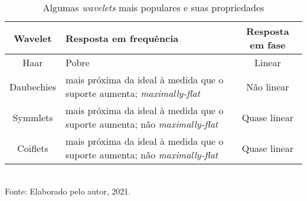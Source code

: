 \begin{table}[h]
	\centering
	\caption{Algumas \textit{wavelets} mais populares e suas propriedades}
	\begin{tabular}{|c|p{75mm}|c|}
			\hline 
			\textbf{Wavelet} & \textbf{Resposta em frequência} & \textbf{Resposta em fase} \\ 
			\hline 
			Haar & Pobre &  Linear \\ 
			\hline 
			Daubechies & mais próxima da ideal à medida que o \newline  suporte aumenta; \textit{maximally-flat}  &  Não linear \\ 
			\hline 
			Symmlets & mais próxima da ideal à medida que o \newline  suporte aumenta; não \textit{maximally-flat}  & Quase linear \\ 
			\hline 
			Coiflets & mais próxima da ideal à medida que o \newline  suporte aumenta; não \textit{maximally-flat}  & Quase linear \\ 
			\hline 
	\end{tabular} 
	\label{tab:waveletsProperties}
	\\Fonte: Elaborado pelo autor, 2021.
\end{table}

